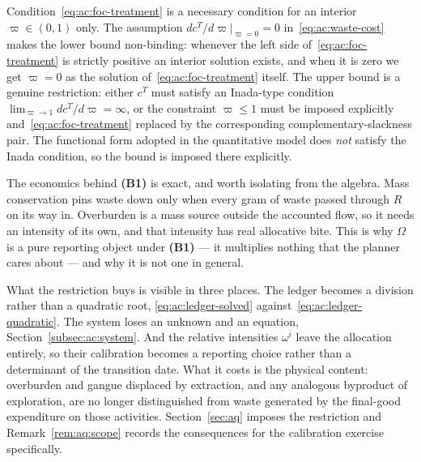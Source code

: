 \begin{remark}\label{rem:ac:varpi}
Condition~\eqref{eq:ac:foc-treatment} is a necessary condition for an interior $\varpi\in(0,1)$ only. The assumption $dc^T/d\varpi|_{\varpi=0}=0$ in~\eqref{eq:ac:waste-cost} makes the lower bound non-binding: whenever the left side of~\eqref{eq:ac:foc-treatment} is strictly positive an interior solution exists, and when it is zero we get $\varpi=0$ as the solution of~\eqref{eq:ac:foc-treatment} itself. The upper bound is a genuine restriction: either $c^T$ must satisfy an Inada-type condition $\lim_{\varpi\to 1}dc^T/d\varpi=\infty$, or the constraint $\varpi\le 1$ must be imposed explicitly and~\eqref{eq:ac:foc-treatment} replaced by the corresponding complementary-slackness pair. The functional form adopted in the quantitative model does \emph{not} satisfy the Inada condition, so the bound is imposed there explicitly.
\end{remark}

\begin{remark}\label{rem:ac:nature}
The economics behind \textbf{(B1)} is exact, and worth isolating from the algebra. Mass conservation pins waste down only when every gram of waste passed through $R$ on its way in. Overburden is a mass source outside the accounted flow, so it needs an intensity of its own, and that intensity has real allocative bite. This is why $\Omega$ is a pure reporting object under \textbf{(B1)} --- it multiplies nothing that the planner cares about --- and why it is not one in general.

What the restriction buys is visible in three places. The ledger becomes a division rather than a quadratic root, \eqref{eq:ac:ledger-solved} against~\eqref{eq:ac:ledger-quadratic}. The system loses an unknown and an equation, Section~\ref{subsec:ac:system}. And the relative intensities $\omega^i$ leave the allocation entirely, so their calibration becomes a reporting choice rather than a determinant of the transition date. What it costs is the physical content: overburden and gangue displaced by extraction, and any analogous byproduct of exploration, are no longer distinguished from waste generated by the final-good expenditure on those activities. Section~\ref{sec:aq} imposes the restriction and Remark~\ref{rem:aq:scope} records the consequences for the calibration exercise specifically.
\end{remark}


